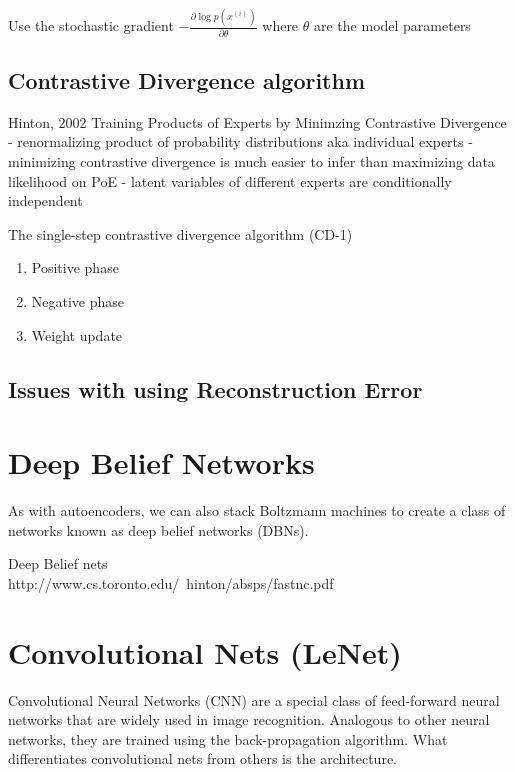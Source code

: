 \documentclass{article}
\begin{document}
\noindent
Use the stochastic gradient $- \frac{\partial \log p(x^(i))}{\partial \theta}$ where $\theta$ are the model parameters

\subsection{Contrastive Divergence algorithm}
Hinton, 2002
Training Products of Experts by Minimzing Contrastive Divergence - renormalizing product of probability distributions aka individual experts - 
minimizing contrastive divergence is much easier to infer than maximizing data likelihood on PoE - latent variables of different experts are conditionally independent



The single-step contrastive divergence algorithm (CD-1)

\begin{enumerate}
	\item Positive phase

	\item Negative phase

	\item Weight update

\end{enumerate}

\subsection{Issues with using Reconstruction Error}


\section{Deep Belief Networks}
As with autoencoders, we can also stack Boltzmann machines to create a class of networks known as deep belief networks (DBNs).

Deep Belief nets \\
http://www.cs.toronto.edu/~hinton/absps/fastnc.pdf \\

\section{Convolutional Nets (LeNet)}
Convolutional Neural Networks (CNN) are a special class of feed-forward neural networks that are widely used in image recognition. Analogous to other neural networks, they are trained using the back-propagation algorithm. What differentiates convolutional nets from others is the architecture.  \\
\end{document}
